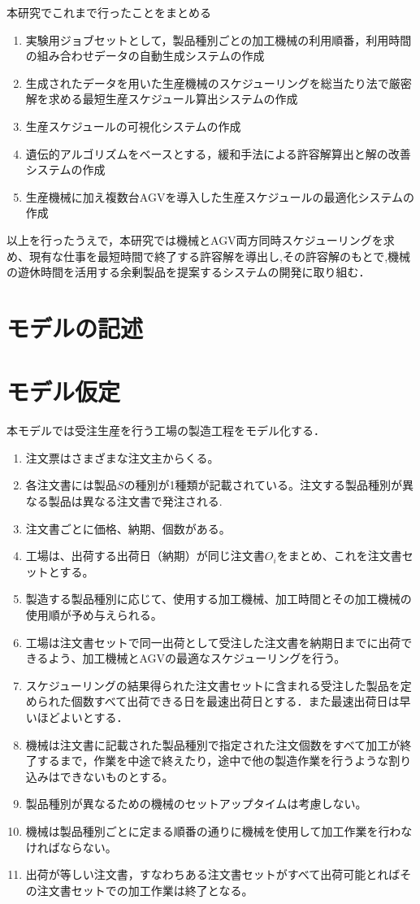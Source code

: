 \documentclass[fleqn]{jarticle}
\begin{document}
本研究でこれまで行ったことをまとめる
\begin{enumerate}
    \item 実験用ジョブセットとして，製品種別ごとの加工機械の利用順番，利用時間の組み合わせデータの自動生成システムの作成
    \item 生成されたデータを用いた生産機械のスケジューリングを総当たり法で厳密解を求める最短生産スケジュール算出システムの作成
    \item 生産スケジュールの可視化システムの作成
    \item 遺伝的アルゴリズムをベースとする，緩和手法による許容解算出と解の改善システムの作成
    \item 生産機械に加え複数台AGVを導入した生産スケジュールの最適化システムの作成
    \end{enumerate}
    以上を行ったうえで，本研究では機械とAGV両方同時スケジューリングを求め、現有な仕事を最短時間で終了する許容解を導出し,その許容解のもとで,機械の遊休時間を活用する余剰製品を提案するシステムの開発に取り組む．
\section{モデルの記述}
\section{モデル仮定}
本モデルでは受注生産を行う工場の製造工程をモデル化する．
\begin{enumerate}
    \item 注文票はさまざまな注文主からくる。
    \item 各注文書には製品$S$の種別が1種類が記載されている。注文する製品種別が異なる製品は異なる注文書で発注される.
    \item 注文書ごとに価格、納期、個数がある。
    \item 工場は、出荷する出荷日（納期）が同じ注文書$O_{\textit{i}}$をまとめ、これを注文書セットとする。
    \item 製造する製品種別に応じて、使用する加工機械、加工時間とその加工機械の使用順が予め与えられる。
    \item 工場は注文書セットで同一出荷として受注した注文書を納期日までに出荷できるよう、加工機械とAGVの最適なスケジューリングを行う。
    \item スケジューリングの結果得られた注文書セットに含まれる受注した製品を定められた個数すべて出荷できる日を最速出荷日とする．また最速出荷日は早いほどよいとする．
    \item 機械は注文書に記載された製品種別で指定された注文個数をすべて加工が終了するまで，作業を中途で終えたり，途中で他の製造作業を行うような割り込みはできないものとする。
    \item 製品種別が異なるための機械のセットアップタイムは考慮しない。
    \item 機械は製品種別ごとに定まる順番の通りに機械を使用して加工作業を行わなければならない。
    \item 出荷が等しい注文書，すなわちある注文書セットがすべて出荷可能とればその注文書セットでの加工作業は終了となる。
    \end{enumerate}
\end{document}

